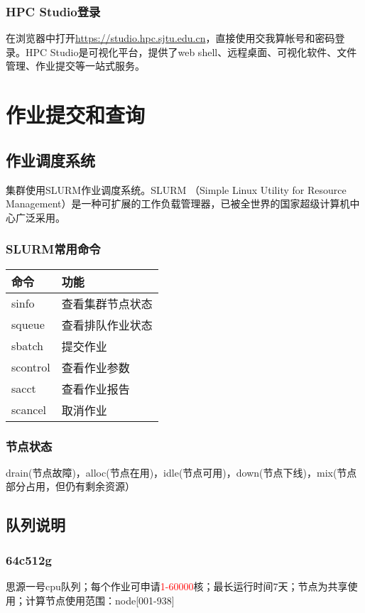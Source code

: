 \documentclass[cn, 12pt, hang, black, chinese]{elegantbook}
\begin{document}
\subsection*{HPC Studio登录}
在浏览器中打开\href{https://studio.hpc.sjtu.edu.cn}{https://studio.hpc.sjtu.edu.cn}，直接使用交我算帐号和密码登录。HPC Studio是可视化平台，提供了web shell、远程桌面、可视化软件、文件管理、作业提交等一站式服务。

\chapter{作业提交和查询}

\section{作业调度系统}
集群使用SLURM作业调度系统。SLURM （Simple Linux Utility for Resource Management）是一种可扩展的工作负载管理器，已被全世界的国家超级计算机中心广泛采用。

\subsection*{SLURM常用命令}

\begin{tabular}{ |l|l| }
 \hline
 命令 & 功能 \\
 \hline \hline
 sinfo & 查看集群节点状态 \\
 \hline
 squeue & 查看排队作业状态 \\
 \hline
 sbatch & 提交作业 \\
 \hline
 scontrol & 查看作业参数 \\
 \hline
 sacct & 查看作业报告 \\
 \hline
 scancel & 取消作业 \\
 \hline
\end{tabular}

\subsection*{节点状态}
drain(节点故障)，alloc(节点在用)，idle(节点可用)，down(节点下线)，mix(节点部分占用，但仍有剩余资源）

\section{队列说明}

\subsection*{64c512g}
思源一号cpu队列；每个作业可申请\textcolor{red}{1-60000}核；最长运行时间7天；节点为共享使用；计算节点使用范围：node[001-938]
\end{document}
